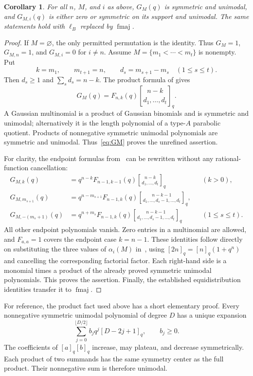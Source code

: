 \documentclass[11pt]{article}
\newtheorem{corollary}[theorem]{Corollary}
\newcommand{\qbin}[2]{\genfrac{[}{]}{0pt}{}{#1}{#2}_q}
\newcommand{\fmaj}{\operatorname{fmaj}}
\begin{document}
\begin{corollary}\label{cor:classes}
For all $n$, $M$, and $i$ as above, $G_M(q)$ is symmetric and unimodal,
and $G_{M,i}(q)$ is either zero or symmetric on its support and unimodal.
The same statements hold with $\ell_B$ replaced by $\fmaj$.
\end{corollary}
\begin{proof}
If $M=\varnothing$, the only permitted permutation is the identity.
Thus $G_M=1$, $G_{M,n}=1$, and $G_{M,i}=0$ for $i\ne n$.
Assume $M=\{m_1<\cdots<m_t\}$ is nonempty. Put
\[
k=m_1,\qquad m_{t+1}=n,\qquad d_s=m_{s+1}-m_s\quad(1\le s\le t).
\]
Then $d_s\ge1$ and $\sum_s d_s=n-k$. The product formula of
\cite[Theorem~3.3]{ABR} gives
\begin{equation}\label{eq:GM}
G_M(q)=F_{n,k}(q)\qbin{n-k}{d_1,\ldots,d_t}.
\end{equation}
A Gaussian multinomial is a product of Gaussian binomials and is symmetric
and unimodal; alternatively it is the length polynomial of a type-$A$
parabolic quotient. Products of nonnegative symmetric unimodal
polynomials are symmetric and unimodal. Thus~\eqref{eq:GM} proves the
unrefined assertion.

For clarity, the endpoint formulas from~\cite[Theorems~4.2--4.3]{ABR}
can be rewritten without any rational-function cancellation:
\begin{align}
G_{M,k}(q)
 &=q^{n-k}F_{n-1,k-1}(q)\qbin{n-k}{d_1,\ldots,d_t}
 &&(k>0),\label{eq:ep1}\\
G_{M,m_{s+1}}(q)
 &=q^{n-m_{s+1}}F_{n-1,k}(q)
 \qbin{n-k-1}{d_1,\ldots,d_s-1,\ldots,d_t},\label{eq:ep2}\\
G_{M,-(m_s+1)}(q)
 &=q^{n+m_s}F_{n-1,k}(q)
 \qbin{n-k-1}{d_1,\ldots,d_s-1,\ldots,d_t}
 &&(1\le s\le t).\label{eq:ep3}
\end{align}
All other endpoint polynomials vanish. Zero entries in a multinomial
are allowed, and $F_{a,a}=1$ covers the endpoint case $k=n-1$.
These identities follow directly on substituting the three values of
$\alpha_i(M)$ in~\cite[Theorem~4.2]{ABR}, using
$[2n]_q=[n]_q(1+q^n)$ and cancelling the corresponding factorial factor.
Each right-hand side is a monomial times a product of the already proved
symmetric unimodal polynomials. This proves the assertion. Finally,
the established equidistribution identities transfer it to $\fmaj$.
\end{proof}

For reference, the product fact used above has a short elementary proof.
Every nonnegative symmetric unimodal polynomial of degree $D$ has a
unique expansion
\[
\sum_{j=0}^{\lfloor D/2\rfloor}b_jq^j[D-2j+1]_q,\qquad b_j\ge0.
\]
The coefficients of $[a]_q[b]_q$ increase, may plateau, and decrease
symmetrically. Each product of two summands has the same symmetry center
as the full product. Their nonnegative sum is therefore unimodal.
\end{document}
